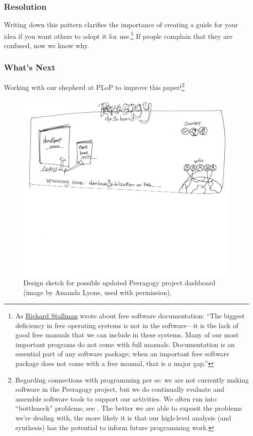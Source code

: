 \subsubsection*{Resolution}
Writing down this pattern clarifies the importance of creating a guide for your idea if you want others to adopt it for use.\footnote{As \href{https://www.gnu.org/philosophy/free-doc.html}{Richard Stallman} wrote about free software documentation: ``The biggest deficiency in free operating systems is not in the software—it is the lack of good free manuals that we can include in these systems. Many of our most important programs do not come with full manuals. Documentation is an essential part of any software package; when an important free software package does not come with a free manual, that is a major gap.''}  If people complain that they are confused, now we know why.

\subsubsection*{What's Next} 
Working with our shepherd at PLoP to improve this paper!\footnote{Regarding connections with programming per se: we are not currently making software in the Peeragogy project, but we do continually evaluate and assemble software tools to support our activities. We often run into ``bottleneck'' problems; see .  The better we are able to exposit the problems we're dealing with, the more likely it is that our high-level analysis (and synthesis) has the potential to inform future programming work.}


\begin{figure}
\includegraphics[width=\textwidth,trim=0mm 135mm 0mm 0mm,clip=true]{figures/peeragogy_dashboard_draft1/peeragogy_dashboard_draft1.jpg}
\caption{Design sketch for possible updated Peeragogy project dashboard (image by Amanda Lyons, used with permission).}
\end{figure}
